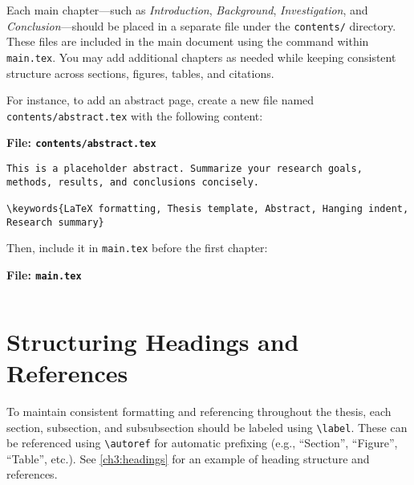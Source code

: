 \begin{paragraph}
Each main chapter—such as \textit{Introduction}, \textit{Background}, \textit{Investigation}, and \textit{Conclusion}—should be placed in a separate file under the \texttt{contents/} directory. These files are included in the main document using the \verb|| command within \texttt{main.tex}. You may add additional chapters as needed while keeping consistent structure across sections, figures, tables, and citations.
\end{paragraph}

\begin{paragraph}
For instance, to add an abstract page, create a new file named \texttt{contents/abstract\newline .tex} with the following content:
\end{paragraph}

\noindent\textbf{File: \texttt{contents/abstract.tex}}\vspace{-1em}
\begin{verbatim}
This is a placeholder abstract. Summarize your research goals, methods, results, and conclusions concisely.

\keywords{LaTeX formatting, Thesis template, Abstract, Hanging indent, Research summary}
\end{verbatim}

\begin{paragraph}
Then, include it in \texttt{main.tex} before the first chapter:
\end{paragraph}

\noindent\textbf{File: \texttt{main.tex}}\vspace{-1em}
\begin{verbatim}

\end{verbatim}

\section{Structuring Headings and References}
\label{ch3:headings}

\begin{paragraph}
To maintain consistent formatting and referencing throughout the thesis, each section, subsection, and subsubsection should be labeled using \verb|\label|. These can be referenced using \verb|\autoref| for automatic prefixing (e.g., ``Section'', ``Figure'', ``Table'', etc.). See \autoref{ch3:headings} for an example of heading structure and references.
\end{paragraph}

